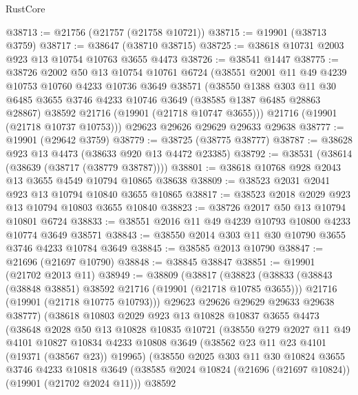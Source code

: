 \begin{lexlean}{RustCore}
\begin{coremodule}
@38713 := @21756 (@21757 (@21758 @10721))
@38715 := @19901 (@38713 @3759)
@38717 := @38647 (@38710 @38715)
@38725 := @38618 @10731 @2003 @923 @13 @10754 @10763 @3655 @4473
@38726 := @38541 @1447
@38775 := @38726
    @2002
    @50
    @13
    @10754
    @10761
    @6724
    (@38551
      @2001
      @11
      @49
      @4239
      @10753
      @10760
      @4233
      @10736
      @3649
      @38571
      (@38550
        @1388
        @303
        @11
        @30
        @6485
        @3655
        @3746
        @4233
        @10746
        @3649
        (@38585 @1387 @6485 @28863 @28867)
        @38592
        @21716
        (@19901 (@21718 @10747 @3655)))
      @21716
      (@19901 (@21718 @10737 @10753)))
    @29623
    @29626
    @29629
    @29633
    @29638
@38777 := @19901 (@29642 @3759)
@38779 := @38725 (@38775 @38777)
@38787 := @38628 @923 @13 @4473 (@38633 @920 @13 @4472 @23385)
@38792 := @38531 (@38614 (@38639 (@38717 (@38779 @38787))))
@38801 := @38618 @10768 @928 @2043 @13 @3655 @4549 @10794 @10865 @38638
@38809 := @38523 @2031 @2041 @923 @13 @10794 @10840 @3655 @10865
@38817 := @38523 @2018 @2029 @923 @13 @10794 @10803 @3655 @10840
@38823 := @38726 @2017 @50 @13 @10794 @10801 @6724
@38833 := @38551 @2016 @11 @49 @4239 @10793 @10800 @4233 @10774 @3649 @38571
@38843 := @38550 @2014 @303 @11 @30 @10790 @3655 @3746 @4233 @10784 @3649
@38845 := @38585 @2013 @10790
@38847 := @21696 (@21697 @10790)
@38848 := @38845 @38847
@38851 := @19901 (@21702 @2013 @11)
@38949 := @38809
    (@38817
      (@38823
        (@38833
          (@38843 (@38848 @38851) @38592 @21716 (@19901 (@21718 @10785 @3655)))
          @21716
          (@19901 (@21718 @10775 @10793)))
        @29623
        @29626
        @29629
        @29633
        @29638
        @38777)
      (@38618
        @10803
        @2029
        @923
        @13
        @10828
        @10837
        @3655
        @4473
        (@38648
          @2028
          @50
          @13
          @10828
          @10835
          @10721
          (@38550
            @279
            @2027
            @11
            @49
            @4101
            @10827
            @10834
            @4233
            @10808
            @3649
            (@38562 @23 @11 @23 @4101 (@19371 (@38567 @23)) @19965)
            (@38550
              @2025
              @303
              @11
              @30
              @10824
              @3655
              @3746
              @4233
              @10818
              @3649
              (@38585 @2024 @10824 (@21696 (@21697 @10824)) (@19901 (@21702 @2024 @11)))
              @38592

\end{coremodule}
\end{lexlean}

